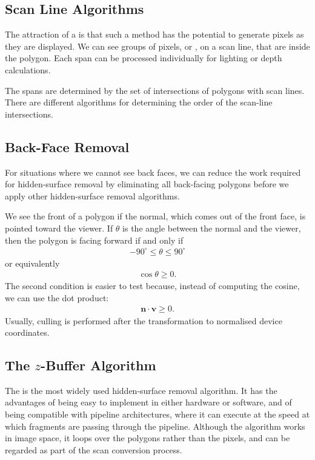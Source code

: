 \documentclass[../COS3712_Notes.tex]{subfiles}
\begin{document}
      \subsection{Scan Line Algorithms}
        The attraction of a  is that such a method has the potential
        to generate pixels as they are displayed.
        We can see groups of pixels, or , on a scan line, that are inside
        the polygon.
        Each span can be processed individually for lighting or depth calculations.

        The spans are determined by the set of intersections of polygons with scan lines.
        There are different algorithms for determining the order of the scan-line intersections.

      \subsection{Back-Face Removal}
        For situations where we cannot see back faces, we can reduce the work required
        for hidden-surface removal by eliminating all back-facing polygons before we apply
        other hidden-surface removal algorithms.

        We see the front of a polygon if the normal, which comes out of the front face,
        is pointed toward the viewer.
        If $\theta$ is the angle between the normal and the viewer,
        then the polygon is facing forward if and only if
        \begin{align*}
          - 90^\circ \leq \theta \leq 90^\circ
        \end{align*}
        or equivalently
        \begin{align*}
          \cos\theta \geq 0.
        \end{align*}
        The second condition is easier to test because, instead of computing the cosine,
        we can use the dot product:
        \begin{align*}
          \mathbf{n} \cdot \mathbf{v} \geq 0.
        \end{align*}
        Usually, culling is performed after the transformation to normalised device coordinates.

      \subsection{The \texorpdfstring{$z$}{z}-Buffer Algorithm}
        The  is the most widely used hidden-surface removal
        algorithm.
        It has the advantages of being easy to implement in either hardware or software,
        and of being compatible with pipeline architectures, where it can execute at the speed
        at which fragments are passing through the pipeline.
        Although the algorithm works in image space, it loops over the polygons rather
        than the pixels, and can be regarded as part of the scan conversion process.
\end{document}
